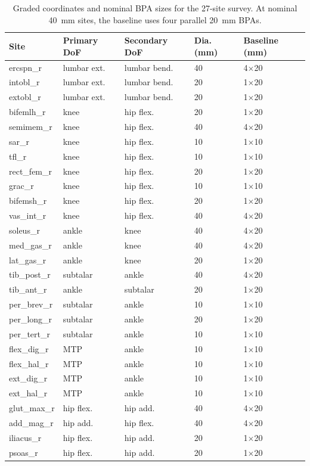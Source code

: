 \documentclass[utf8]{frontiers_suppmat} %
\renewcommand{\arraystretch}{1.5}  %
\begin{document}
\begin{table}[htbp]
\centering
\caption{Graded coordinates and nominal BPA sizes for the 27-site survey. At nominal \qty{40}{\mm} sites, the baseline uses four parallel \qty{20}{\mm} BPAs.}
\label{tab:survey_dofs_sizes}
\begingroup\small\renewcommand{\arraystretch}{1.1}
\begin{tabular}{@{}lllll@{}}
\toprule
\textbf{Site} & \textbf{Primary DoF} & \textbf{Secondary DoF} & \textbf{Dia. (mm)} & \textbf{Baseline (mm)} \\
\midrule
ercspn\_r & lumbar ext. & lumbar bend. & 40 & 4$\times$20 \\
intobl\_r & lumbar ext. & lumbar bend. & 20 & 1$\times$20 \\
extobl\_r & lumbar ext. & lumbar bend. & 20 & 1$\times$20 \\
bifemlh\_r & knee & hip flex. & 20 & 1$\times$20 \\
semimem\_r & knee & hip flex. & 40 & 4$\times$20 \\
sar\_r & knee & hip flex. & 10 & 1$\times$10 \\
tfl\_r & knee & hip flex. & 10 & 1$\times$10 \\
rect\_fem\_r & knee & hip flex. & 20 & 1$\times$20 \\
grac\_r & knee & hip flex. & 10 & 1$\times$10 \\
bifemsh\_r & knee & hip flex. & 20 & 1$\times$20 \\
vas\_int\_r & knee & hip flex. & 40 & 4$\times$20 \\
soleus\_r & ankle & knee & 40 & 4$\times$20 \\
med\_gas\_r & ankle & knee & 40 & 4$\times$20 \\
lat\_gas\_r & ankle & knee & 20 & 1$\times$20 \\
tib\_post\_r & subtalar & ankle & 40 & 4$\times$20 \\
tib\_ant\_r & ankle & subtalar & 20 & 1$\times$20 \\
per\_brev\_r & subtalar & ankle & 10 & 1$\times$10 \\
per\_long\_r & subtalar & ankle & 20 & 1$\times$20 \\
per\_tert\_r & subtalar & ankle & 10 & 1$\times$10 \\
flex\_dig\_r & MTP & ankle & 10 & 1$\times$10 \\
flex\_hal\_r & MTP & ankle & 10 & 1$\times$10 \\
ext\_dig\_r & MTP & ankle & 10 & 1$\times$10 \\
ext\_hal\_r & MTP & ankle & 10 & 1$\times$10 \\
glut\_max\_r & hip flex. & hip add. & 40 & 4$\times$20 \\
add\_mag\_r & hip add. & hip flex. & 40 & 4$\times$20 \\
iliacus\_r & hip flex. & hip add. & 20 & 1$\times$20 \\
psoas\_r & hip flex. & hip add. & 20 & 1$\times$20 \\
\bottomrule
\end{tabular}
\endgroup
\end{table}
\end{document}

